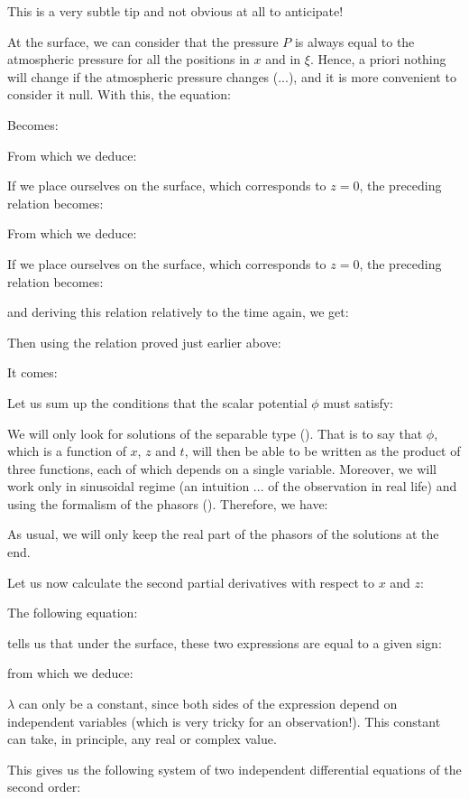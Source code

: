 	This is a very subtle tip and not obvious at all to anticipate!

	At the surface, we can consider that the pressure $P$ is always equal to the atmospheric pressure for all the positions in $x$ and in $\xi$. Hence, a priori nothing will change if the atmospheric pressure changes (...), and it is more convenient to consider it null. With this, the equation:
	
	Becomes:
	
	From which we deduce:
	
	If we place ourselves on the surface, which corresponds to $z=0$, the preceding relation becomes:
	
	From which we deduce:
	
	If we place ourselves on the surface, which corresponds to $z=0$, the preceding relation becomes:
		
	and deriving this relation relatively to the time again, we get:
	
	Then using the relation proved just earlier above:
	
	It comes:
	
	Let us sum up the conditions that the scalar potential $\phi$ must satisfy:
	
	We will only look for solutions of the separable type (). That is to say that $\phi$, which is a function of $x$, $z$ and $t$, will then be able to be written as the product of three functions, each of which depends on a single variable. Moreover, we will work only in sinusoidal regime (an intuition ... of the observation in real life) and using the formalism of the phasors (). Therefore, we have:
	
	As usual, we will only keep the real part of the phasors of the solutions at the end. 

	Let us now calculate the second partial derivatives with respect to $x$ and $z$:
		
	The following equation:
	
	tells us that under the surface, these two expressions are equal to a given sign:
	
	from which we deduce:
	
	$\lambda$ can only be a constant, since both sides of the expression depend on independent variables (which is very tricky for an observation!). This constant can take, in principle, any real or complex value.

	This gives us the following system of two independent differential equations of the second order:
	
